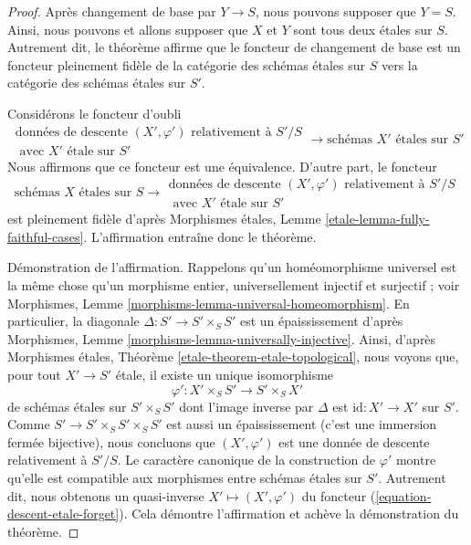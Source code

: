 \begin{proof}
Apr\`es changement de base par $Y \to S$, nous pouvons supposer que $Y = S$.
Ainsi, nous pouvons et allons supposer que $X$ et $Y$ sont tous deux \'etales sur $S$.
Autrement dit, le th\'eor\`eme affirme que le foncteur de changement de base
est un foncteur pleinement fid\`ele de la cat\'egorie des sch\'emas \'etales
sur $S$ vers la cat\'egorie des sch\'emas \'etales sur $S'$.

\medskip\noindent
Consid\'erons le foncteur d'oubli
\begin{equation}
\label{equation-descent-etale-forget}
\begin{matrix}
\text{donn\'ees de descente }(X', \varphi')\text{ relativement \`a }S'/S \\
\text{ avec }X'\text{ \'etale sur }S'
\end{matrix}
\longrightarrow
\text{sch\'emas }X'\text{ \'etales sur }S'
\end{equation}
Nous affirmons que ce foncteur est une \'equivalence. D'autre part, le
foncteur
\begin{equation}
\label{equation-descent-etale}
\text{sch\'emas }X\text{ \'etales sur }S \longrightarrow
\begin{matrix}
\text{donn\'ees de descente }(X', \varphi')\text{ relativement \`a }S'/S \\
\text{ avec }X'\text{ \'etale sur }S'
\end{matrix}
\end{equation}
est pleinement fid\`ele d'apr\`es Morphismes étales, Lemme
\ref{etale-lemma-fully-faithful-cases}.
L'affirmation entra\^ine donc le th\'eor\`eme.

\medskip\noindent
D\'emonstration de l'affirmation.
Rappelons qu'un hom\'eomorphisme universel est la m\^eme chose qu'un morphisme
entier, universellement injectif et surjectif ; voir
Morphismes, Lemme \ref{morphisms-lemma-universal-homeomorphism}.
En particulier, la diagonale $\Delta : S' \to S' \times_S S'$ est un \'epaississement
d'apr\`es Morphismes, Lemme \ref{morphisms-lemma-universally-injective}.
Ainsi, d'apr\`es Morphismes étales, Th\'eor\`eme
\ref{etale-theorem-etale-topological},
nous voyons que, pour tout $X' \to S'$ \'etale, il existe un unique isomorphisme
$$
\varphi' : X' \times_S S' \to S' \times_S X'
$$
de sch\'emas \'etales sur $S' \times_S S'$ dont l'image inverse par
$\Delta$ est $\text{id} : X' \to X'$ sur $S'$.
Comme $S' \to S' \times_S S' \times_S S'$
est aussi un \'epaississement (c'est une immersion ferm\'ee bijective),
nous concluons que $(X', \varphi')$ est une donn\'ee de descente relativement \`a $S'/S$.
Le caract\`ere canonique de la construction de $\varphi'$ montre
qu'elle est compatible aux morphismes entre sch\'emas \'etales sur $S'$.
Autrement dit, nous obtenons un quasi-inverse
$X' \mapsto (X', \varphi')$ du foncteur
(\ref{equation-descent-etale-forget}). Cela d\'emontre l'affirmation et
ach\`eve la d\'emonstration du th\'eor\`eme.
\end{proof}

